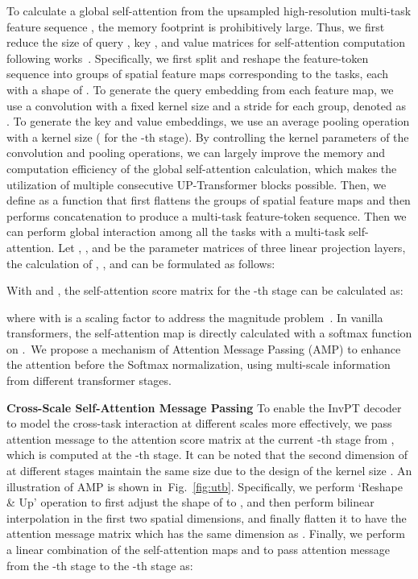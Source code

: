 \documentclass[runningheads]{llncs}
\begin{document}
\par To calculate a global self-attention from the upsampled high-resolution multi-task feature sequence , the memory footprint is prohibitively large. Thus, we first reduce the size of query , key , and value  matrices for self-attention computation following works~\cite{pvt,cvt}.
Specifically, we first split and reshape the feature-token sequence  into  groups of spatial feature maps corresponding to the  tasks, each with a shape of . To generate the query embedding from each feature map, we use a convolution with a fixed kernel size  and a stride  for each group, denoted as . To generate the key and value embeddings, we use an average pooling operation  with a kernel size  ( for the -th stage). By controlling the kernel parameters of the convolution and pooling operations, we can largely improve the memory and computation efficiency of the global self-attention calculation, which makes the utilization of multiple consecutive UP-Transformer blocks possible.
Then, we define  as a function that first flattens the  groups of spatial feature maps and then performs concatenation to produce a multi-task feature-token sequence. Then we can perform global interaction among all the tasks with a multi-task self-attention. Let , , and  be the parameter matrices of three linear projection layers, the calculation of , , and  can be formulated as follows:


With  and , the self-attention score matrix  for the -th stage can be calculated as:

where  with  is a scaling factor to address the magnitude problem~\cite{transformer}. In vanilla transformers, the self-attention map is directly calculated with a softmax function on .~We propose a mechanism of Attention Message Passing (AMP) to enhance the attention  before the Softmax normalization, using multi-scale information from different transformer stages.

\vspace{3pt}
\par\noindent\textbf{Cross-Scale Self-Attention Message Passing} To enable the InvPT decoder to model the cross-task interaction at different scales more effectively, we pass attention message to the attention score matrix  at the current -th stage from , which is computed at the -th stage. It can be noted that the second dimension of  at different stages maintain the same size due to the design of the kernel size .
An illustration of AMP is shown in~Fig.~\ref{fig:utb}. Specifically, we perform `Reshape \& Up' operation to first adjust the shape of  to , and then perform  bilinear interpolation in the first two spatial dimensions, and finally flatten it to have the attention message matrix  which has the same dimension as .
Finally, we perform a linear combination of the self-attention maps  and  to pass attention message from the -th stage to the -th stage as:
\end{document}
